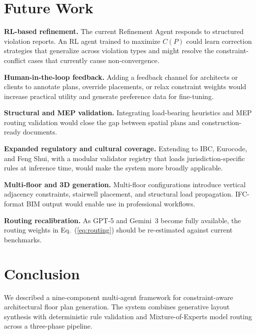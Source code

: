\documentclass[journal]{IEEEtran}
\begin{document}
\section{Future Work}
\label{sec:future}

\textbf{RL-based refinement.} The current Refinement Agent responds to
structured violation reports. An RL agent trained to maximize $C(P)$ could
learn correction strategies that generalize across violation types and might
resolve the constraint-conflict cases that currently cause non-convergence.

\textbf{Human-in-the-loop feedback.} Adding a feedback channel for architects
or clients to annotate plans, override placements, or relax constraint weights
would increase practical utility and generate preference data for fine-tuning.

\textbf{Structural and MEP validation.} Integrating load-bearing heuristics
and MEP routing validation would close the gap between spatial plans and
construction-ready documents.

\textbf{Expanded regulatory and cultural coverage.} Extending to IBC,
Eurocode, and Feng Shui, with a modular validator registry that loads
jurisdiction-specific rules at inference time, would make the system more
broadly applicable.

\textbf{Multi-floor and 3D generation.} Multi-floor configurations introduce
vertical adjacency constraints, stairwell placement, and structural load
propagation. IFC-format BIM output would enable use in professional workflows.

\textbf{Routing recalibration.} As GPT-5 and Gemini~3 become fully available,
the routing weights in Eq.~(\ref{eq:routing}) should be re-estimated against
current benchmarks.

\section{Conclusion}

We described a nine-component multi-agent framework for constraint-aware
architectural floor plan generation. The system combines generative layout
synthesis with deterministic rule validation and Mixture-of-Experts model
routing across a three-phase pipeline.
\end{document}
